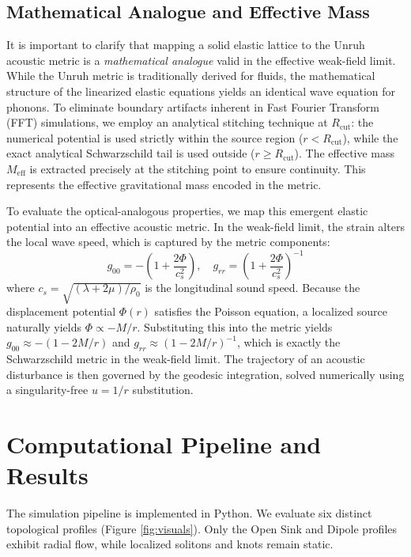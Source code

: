 \documentclass[11pt,a4paper]{article}
\begin{document}
\subsection*{Mathematical Analogue and Effective Mass}
It is important to clarify that mapping a solid elastic lattice to the Unruh acoustic metric is a \textit{mathematical analogue} valid in the effective weak-field limit. While the Unruh metric is traditionally derived for fluids, the mathematical structure of the linearized elastic equations yields an identical wave equation for phonons. To eliminate boundary artifacts inherent in Fast Fourier Transform (FFT) simulations, we employ an analytical stitching technique at \(R_{\text{cut}}\): the numerical potential is used strictly within the source region (\(r < R_{\text{cut}}\)), while the exact analytical Schwarzschild tail is used outside (\(r \ge R_{\text{cut}}\)). The effective mass \(M_{\text{eff}}\) is extracted precisely at the stitching point to ensure continuity. This represents the effective gravitational mass encoded in the metric.

To evaluate the optical-analogous properties, we map this emergent elastic potential into an effective acoustic metric. In the weak-field limit, the strain alters the local wave speed, which is captured by the metric components:
\begin{equation}
g_{00} = -\left(1 + \frac{2\Phi}{c_s^2}\right), \quad g_{rr} = \left(1 + \frac{2\Phi}{c_s^2}\right)^{-1}
\end{equation}
where $c_s = \sqrt{(\lambda+2\mu)/\rho_0}$ is the longitudinal sound speed. Because the displacement potential \(\Phi(r)\) satisfies the Poisson equation, a localized source naturally yields \(\Phi \propto -M/r\). Substituting this into the metric yields \(g_{00} \approx -(1 - 2M/r)\) and \(g_{rr} \approx (1 - 2M/r)^{-1}\), which is exactly the Schwarzschild metric in the weak-field limit. The trajectory of an acoustic disturbance is then governed by the geodesic integration, solved numerically using a singularity-free \(u=1/r\) substitution.

\section{Computational Pipeline and Results}
The simulation pipeline is implemented in Python. We evaluate six distinct topological profiles (Figure \ref{fig:visuals}). Only the Open Sink and Dipole profiles exhibit radial flow, while localized solitons and knots remain static.
\end{document}
